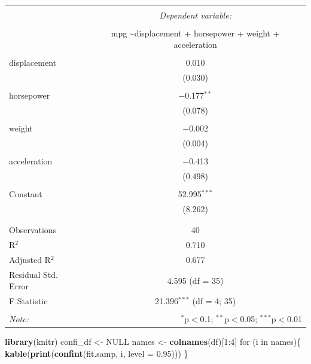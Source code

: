 \documentclass[]{article}
\newenvironment{Shaded}{\begin{snugshade}}{\end{snugshade}}
\newcommand{\KeywordTok}[1]{\textcolor[rgb]{0.13,0.29,0.53}{\textbf{{#1}}}}
\newcommand{\DataTypeTok}[1]{\textcolor[rgb]{0.13,0.29,0.53}{{#1}}}
\newcommand{\DecValTok}[1]{\textcolor[rgb]{0.00,0.00,0.81}{{#1}}}
\newcommand{\FloatTok}[1]{\textcolor[rgb]{0.00,0.00,0.81}{{#1}}}
\newcommand{\StringTok}[1]{\textcolor[rgb]{0.31,0.60,0.02}{{#1}}}
\newcommand{\OtherTok}[1]{\textcolor[rgb]{0.56,0.35,0.01}{{#1}}}
\newcommand{\NormalTok}[1]{{#1}}
\begin{document}
\begin{table}[!htbp] \centering 
  \caption{} 
  \label{} 
\begin{tabular}{@{\extracolsep{5pt}}lc} 
\\[-1.8ex]\hline 
\hline \\[-1.8ex] 
 & \multicolumn{1}{c}{\textit{Dependent variable:}} \\ 
\cline{2-2} 
\\[-1.8ex] & mpg \textasciitilde displacement + horsepower + weight + acceleration \\ 
\hline \\[-1.8ex] 
 displacement & 0.010 \\ 
  & (0.030) \\ 
  & \\ 
 horsepower & $-$0.177$^{**}$ \\ 
  & (0.078) \\ 
  & \\ 
 weight & $-$0.002 \\ 
  & (0.004) \\ 
  & \\ 
 acceleration & $-$0.413 \\ 
  & (0.498) \\ 
  & \\ 
 Constant & 52.995$^{***}$ \\ 
  & (8.262) \\ 
  & \\ 
\hline \\[-1.8ex] 
Observations & 40 \\ 
R$^{2}$ & 0.710 \\ 
Adjusted R$^{2}$ & 0.677 \\ 
Residual Std. Error & 4.595 (df = 35) \\ 
F Statistic & 21.396$^{***}$ (df = 4; 35) \\ 
\hline 
\hline \\[-1.8ex] 
\textit{Note:}  & \multicolumn{1}{r}{$^{*}$p$<$0.1; $^{**}$p$<$0.05; $^{***}$p$<$0.01} \\ 
\end{tabular} 
\end{table}

\begin{Shaded}
\begin{Highlighting}[]
\KeywordTok{library}\NormalTok{(knitr)}
\NormalTok{confi_df <-}\StringTok{ }\OtherTok{NULL}
\NormalTok{names <-}\StringTok{ }\KeywordTok{colnames}\NormalTok{(df)[}\DecValTok{1}\NormalTok{:}\DecValTok{4}\NormalTok{]}
\NormalTok{for (i in names)\{}
\KeywordTok{kable}\NormalTok{(}\KeywordTok{print}\NormalTok{(}\KeywordTok{confint}\NormalTok{(fit.samp, i, }\DataTypeTok{level =} \FloatTok{0.95}\NormalTok{)))}
\NormalTok{\}}
\end{Highlighting}
\end{Shaded}
\end{document}

